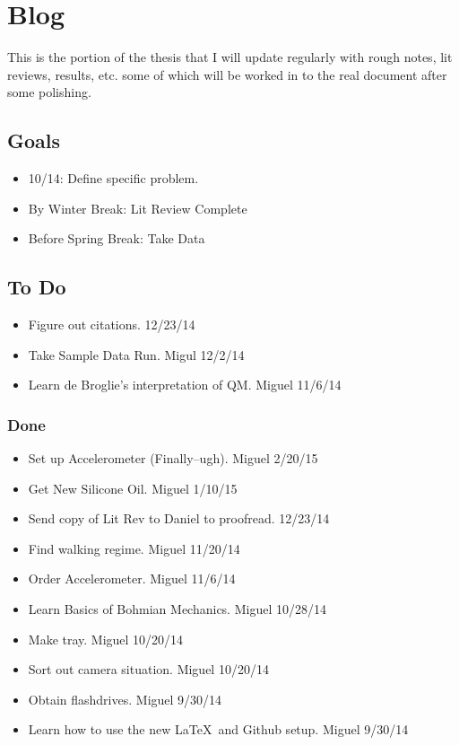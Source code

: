 \chapter*{Blog}
	
	This is the portion of the thesis that I will update regularly with rough notes, lit reviews, results, etc. some of which will be worked in to the real document after some polishing. 
	\section{Goals}
	\begin{itemize}
	\item{10/14: Define specific problem.}
	\item{By Winter Break: Lit Review Complete}
    \item{Before Spring Break: Take Data}
	\end{itemize}

	
	
	\section{To Do}
	\begin{itemize}
	\item{Figure out citations. 12/23/14}
     \item{Take Sample Data Run. Migul 12/2/14}
     \item{Learn de Broglie's interpretation of QM. Miguel 11/6/14}
	\end{itemize}
	
	\subsection{Done}
	\begin{itemize}
	 \item{Set up Accelerometer (Finally--ugh). Miguel 
 2/20/15}
     \item{Get New Silicone Oil. Miguel 1/10/15}
     \item{Send copy of Lit Rev to Daniel to proofread. 12/23/14}
	\item{Find walking regime. Miguel 11/20/14}
	\item{Order Accelerometer. Miguel 11/6/14}
	\item{Learn Basics of Bohmian Mechanics. Miguel 10/28/14}
	\item{Make tray. Miguel 10/20/14}
	\item{Sort out camera situation. Miguel 10/20/14}
	\item{Obtain flashdrives.    Miguel 9/30/14}
	\item{Learn how to use the new \LaTeX\ and Github setup. Miguel 9/30/14}
	\end{itemize}
	
